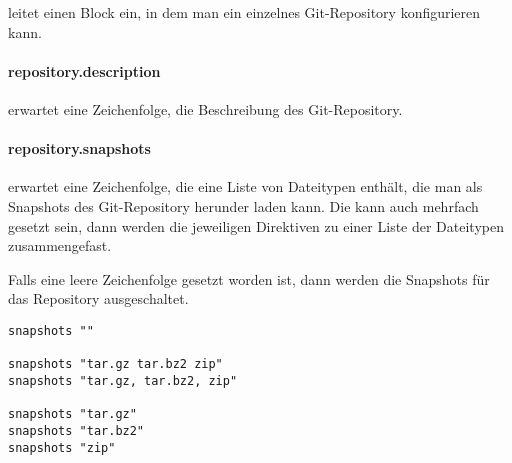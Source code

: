  leitet einen Block ein, in dem man ein einzelnes
Git-Repository konfigurieren kann.

\paragraph{repository.description}

 erwartet eine Zeichenfolge, die Beschreibung des
Git-Repository.

\paragraph{repository.snapshots}

 erwartet eine Zeichenfolge, die eine Liste von Dateitypen
enthält, die man als Snapshots des Git-Repository herunder laden kann. Die
 kann auch mehrfach gesetzt sein, dann werden die
jeweiligen Direktiven zu einer Liste der Dateitypen zusammengefast.

Falls eine leere Zeichenfolge gesetzt worden ist, dann werden die Snapshots für
das Repository ausgeschaltet.

\begin{lstlisting}[style=Java, caption=Beispiele für die \directive{snapshots}]
snapshots ""

snapshots "tar.gz tar.bz2 zip"
snapshots "tar.gz, tar.bz2, zip"

snapshots "tar.gz"
snapshots "tar.bz2"
snapshots "zip"
\end{lstlisting}
